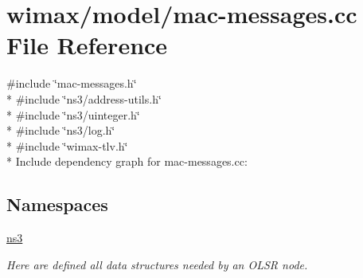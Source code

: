 \hypertarget{mac-messages_8cc}{}\section{wimax/model/mac-\/messages.cc File Reference}
\label{mac-messages_8cc}
{\ttfamily \#include \char`\"{}mac-\/messages.\+h\char`\"{}}\\*
{\ttfamily \#include \char`\"{}ns3/address-\/utils.\+h\char`\"{}}\\*
{\ttfamily \#include \char`\"{}ns3/uinteger.\+h\char`\"{}}\\*
{\ttfamily \#include \char`\"{}ns3/log.\+h\char`\"{}}\\*
{\ttfamily \#include \char`\"{}wimax-\/tlv.\+h\char`\"{}}\\*
Include dependency graph for mac-\/messages.cc\+:
\subsection*{Namespaces}
\begin{DoxyCompactItemize}
\item 
 \hyperlink{namespacens3}{ns3}
\begin{DoxyCompactList}\small\item\em Here are defined all data structures needed by an O\+L\+SR node. \end{DoxyCompactList}\end{DoxyCompactItemize}
